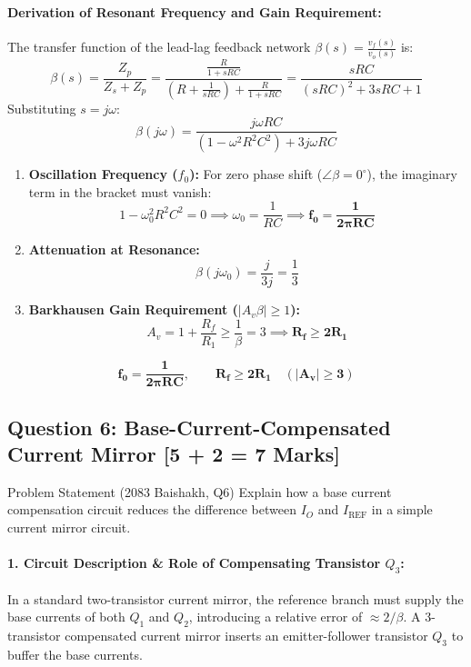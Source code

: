 \documentclass[11pt,a4paper,oneside]{book}
\begin{document}
\paragraph{Derivation of Resonant Frequency and Gain Requirement:}
The transfer function of the lead-lag feedback network $\beta(s) = \frac{v_f(s)}{v_o(s)}$ is:
\[
\beta(s) = \frac{Z_p}{Z_s + Z_p} = \frac{\frac{R}{1+sRC}}{\left(R + \frac{1}{sRC}\right) + \frac{R}{1+sRC}} = \frac{sRC}{(sRC)^2 + 3sRC + 1}
\]
Substituting $s = j\omega$:
\[
\beta(j\omega) = \frac{j\omega RC}{(1 - \omega^2 R^2 C^2) + 3j\omega RC}
\]
\begin{enumerate}[leftmargin=1.5em]
  \item \textbf{Oscillation Frequency ($f_0$):} For zero phase shift ($\angle \beta = 0^\circ$), the imaginary term in the bracket must vanish:
  \[
  1 - \omega_0^2 R^2 C^2 = 0 \implies \omega_0 = \frac{1}{RC} \implies \mathbf{f_0 = \frac{1}{2\pi RC}}
  \]
  \item \textbf{Attenuation at Resonance:}
  \[
  \beta(j\omega_0) = \frac{j}{3j} = \frac{1}{3}
  \]
  \item \textbf{Barkhausen Gain Requirement ($|A_v \beta| \ge 1$):}
  \[
  A_v = 1 + \frac{R_f}{R_1} \ge \frac{1}{\beta} = 3 \implies \mathbf{R_f \ge 2 R_1}
  \]
\end{enumerate}

\begin{answerbox}
$$\mathbf{f_0 = \frac{1}{2\pi RC}, \qquad R_f \ge 2 R_1 \quad (|A_v| \ge 3)}$$
\end{answerbox}

\vspace{0.6cm}

\subsection{Question 6: Base-Current-Compensated Current Mirror [5 + 2 = 7 Marks]}
\begin{questionbox}{Problem Statement (2083 Baishakh, Q6)}
Explain how a base current compensation circuit reduces the difference between $I_O$ and $I_{\text{REF}}$ in a simple current mirror circuit.
\end{questionbox}

\paragraph{1. Circuit Description \& Role of Compensating Transistor $Q_3$:}
In a standard two-transistor current mirror, the reference branch must supply the base currents of both $Q_1$ and $Q_2$, introducing a relative error of $\approx 2/\beta$. A 3-transistor compensated current mirror inserts an emitter-follower transistor $Q_3$ to buffer the base currents.
\end{document}
